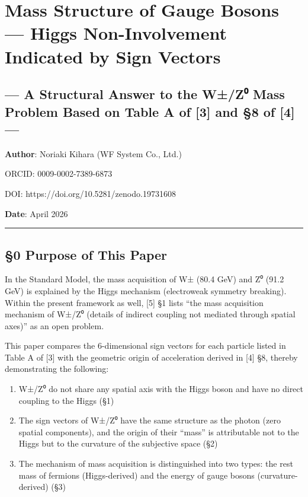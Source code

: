 \documentclass[
  a4paper,11pt]{article}
\providecommand{\tightlist}{%
  \setlength{\itemsep}{0pt}\setlength{\parskip}{0pt}}
\theoremstyle{definition}
\theoremstyle{remark}
\begin{document}
\section{Mass Structure of Gauge Bosons --- Higgs Non-Involvement
Indicated by Sign
Vectors}\label{mass-structure-of-gauge-bosons-higgs-non-involvement-indicated-by-sign-vectors}

\subsection{--- A Structural Answer to the W±/Z⁰ Mass Problem Based on
Table A of {[}3{]} and §8 of {[}4{]}
---}\label{a-structural-answer-to-the-wzux2070-mass-problem-based-on-table-a-of-3-and-8-of-4}

\textbf{Author}: Noriaki Kihara (WF System Co., Ltd.)

ORCID: 0009-0002-7389-6873

DOI: https://doi.org/10.5281/zenodo.19731608

\textbf{Date}: April 2026

\begin{center}\rule{0.5\linewidth}{0.5pt}\end{center}

\subsection{§0 Purpose of This Paper}\label{purpose-of-this-paper}

In the Standard Model, the mass acquisition of W± (80.4 GeV) and Z⁰
(91.2 GeV) is explained by the Higgs mechanism (electroweak symmetry
breaking). Within the present framework as well, {[}5{]} §1 lists ``the
mass acquisition mechanism of W±/Z⁰ (details of indirect coupling not
mediated through spatial axes)'' as an open problem.

This paper compares the 6-dimensional sign vectors for each particle
listed in Table A of {[}3{]} with the geometric origin of acceleration
derived in {[}4{]} §8, thereby demonstrating the following:

\begin{enumerate}
\def\labelenumi{\arabic{enumi}.}
\tightlist
\item
  W±/Z⁰ do not share any spatial axis with the Higgs boson and have no
  direct coupling to the Higgs (§1)
\item
  The sign vectors of W±/Z⁰ have the same structure as the photon (zero
  spatial components), and the origin of their ``mass'' is attributable
  not to the Higgs but to the curvature of the subjective space (§2)
\item
  The mechanism of mass acquisition is distinguished into two types: the
  rest mass of fermions (Higgs-derived) and the energy of gauge bosons
  (curvature-derived) (§3)
\end{enumerate}
\end{document}
